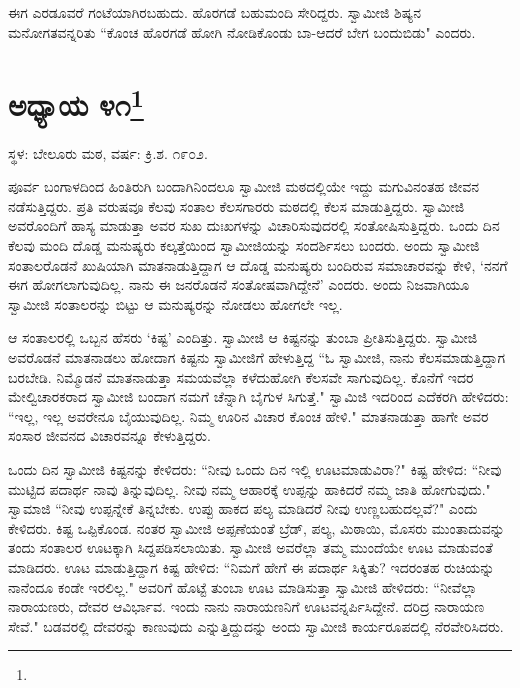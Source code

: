 ಈಗ ಎರಡೂವರೆ ಗಂಟೆಯಾಗಿರಬಹುದು. ಹೊರಗಡೆ ಬಹುಮಂದಿ ಸೇರಿದ್ದರು. ಸ್ವಾಮೀಜಿ ಶಿಷ್ಯನ ಮನೋಗತವನ್ನರಿತು “ಕೊಂಚ ಹೊರಗಡೆ ಹೋಗಿ ನೋಡಿಕೊಂಡು ಬಾ-ಆದರೆ ಬೇಗ ಬಂದುಬಿಡು" ಎಂದರು.

\newpage

\chapter[ಅಧ್ಯಾಯ ೪೧]{ಅಧ್ಯಾಯ ೪೧\protect\footnote{}}

\centerline{ಸ್ಥಳ: ಬೇಲೂರು ಮಠ, ವರ್ಷ: ಕ್ರಿ.ಶ. ೧೯೦೨.}

ಪೂರ್ವ ಬಂಗಾಳದಿಂದ ಹಿಂತಿರುಗಿ ಬಂದಾಗಿನಿಂದಲೂ ಸ್ವಾಮೀಜಿ ಮಠದಲ್ಲಿಯೇ ಇದ್ದು ಮಗುವಿನಂತಹ ಜೀವನ ನಡೆಸುತ್ತಿದ್ದರು. ಪ್ರತಿ ವರುಷವೂ ಕೆಲವು ಸಂತಾಲ ಕೆಲಸಗಾರರು ಮಠದಲ್ಲಿ ಕೆಲಸ ಮಾಡುತ್ತಿದ್ದರು. ಸ್ವಾಮೀಜಿ ಅವರೊಂದಿಗೆ ಹಾಸ್ಯ ಮಾಡುತ್ತಾ ಅವರ ಸುಖ ದುಃಖಗಳನ್ನು ವಿಚಾರಿಸುವುದರಲ್ಲಿ ಸಂತೋಷಿಸುತ್ತಿದ್ದರು. ಒಂದು ದಿನ ಕೆಲವು ಮಂದಿ ದೊಡ್ಡ ಮನುಷ್ಯರು ಕಲ್ಕತ್ತೆಯಿಂದ ಸ್ವಾಮೀಜಿಯನ್ನು ಸಂದರ್ಶಿಸಲು ಬಂದರು. ಅಂದು ಸ್ವಾಮೀಜಿ ಸಂತಾಲರೊಡನೆ ಖುಷಿಯಾಗಿ ಮಾತನಾಡುತ್ತಿದ್ದಾಗ ಆ ದೊಡ್ಡ ಮನುಷ್ಯರು ಬಂದಿರುವ ಸಮಾಚಾರವನ್ನು ಕೇಳಿ, ‘ನನಗೆ ಈಗ ಹೋಗಲಾಗುವುದಿಲ್ಲ. ನಾನು ಈ ಜನರೊಡನೆ ಸಂತೋಷವಾಗಿದ್ದೇನೆ’ ಎಂದರು. ಅಂದು ನಿಜವಾಗಿಯೂ ಸ್ವಾಮೀಜಿ ಸಂತಾಲರನ್ನು ಬಿಟ್ಟು ಆ ಮನುಷ್ಯರನ್ನು ನೋಡಲು ಹೋಗಲೇ ಇಲ್ಲ.

ಆ ಸಂತಾಲರಲ್ಲಿ ಒಬ್ಬನ ಹೆಸರು ‘ಕಿಷ್ಟ’ ಎಂದಿತ್ತು. ಸ್ವಾಮೀಜಿ ಆ ಕಿಷ್ಟನನ್ನು ತುಂಬಾ ಪ್ರೀತಿಸುತ್ತಿದ್ದರು. ಸ್ವಾಮೀಜಿ ಅವರೊಡನೆ ಮಾತನಾಡಲು ಹೋದಾಗ ಕಿಷ್ಟನು ಸ್ವಾಮೀಜಿಗೆ ಹೇಳುತ್ತಿದ್ದ “ಓ ಸ್ವಾಮೀಜಿ, ನಾನು ಕೆಲಸಮಾಡುತ್ತಿದ್ದಾಗ ಬರಬೇಡಿ. ನಿಮ್ಮೊಡನೆ ಮಾತನಾಡುತ್ತಾ ಸಮಯವೆಲ್ಲಾ ಕಳೆದುಹೋಗಿ ಕೆಲಸವೇ ಸಾಗುವುದಿಲ್ಲ. ಕೊನೆಗೆ ಇದರ ಮೇಲ್ವಿಚಾರಕರಾದ ಸ್ವಾಮೀಜಿ ಬಂದಾಗ ನಮಗೆ ಚೆನ್ನಾಗಿ ಬೈಗುಳ ಸಿಗುತ್ತೆ." ಸ್ವಾಮಿಜಿ ಇದರಿಂದ ಎದೆಕರಗಿ ಹೇಳಿದರು: “ಇಲ್ಲ, ಇಲ್ಲ ಅವರೇನೂ ಬೈಯುವುದಿಲ್ಲ. ನಿಮ್ಮ ಊರಿನ ವಿಚಾರ ಕೊಂಚ ಹೇಳಿ." ಮಾತನಾಡುತ್ತಾ ಹಾಗೇ ಅವರ ಸಂಸಾರ ಜೀವನದ ವಿಚಾರವನ್ನೂ ಕೇಳುತ್ತಿದ್ದರು.

ಒಂದು ದಿನ ಸ್ವಾಮೀಜಿ ಕಿಷ್ಟನನ್ನು ಕೇಳಿದರು: “ನೀವು ಒಂದು ದಿನ ಇಲ್ಲಿ ಊಟಮಾಡುವಿರಾ?" ಕಿಷ್ಟ ಹೇಳಿದ: “ನೀವು ಮುಟ್ಟಿದ ಪದಾರ್ಥ ನಾವು ತಿನ್ನುವುದಿಲ್ಲ. ನೀವು ನಮ್ಮ ಆಹಾರಕ್ಕೆ ಉಪ್ಪನ್ನು ಹಾಕಿದರೆ ನಮ್ಮ ಜಾತಿ ಹೋಗುವುದು." ಸ್ವಾಮಾಜಿ “ನೀವು ಉಪ್ಪನ್ನೇಕೆ ತಿನ್ನಬೇಕು. ಉಪ್ಪು ಹಾಕದ ಪಲ್ಯ ಮಾಡಿದರೆ ನೀವು ಉಣ್ಣಬಹುದಲ್ಲವೆ?" ಎಂದು ಕೇಳಿದರು. ಕಿಷ್ಟ ಒಪ್ಪಿಕೊಂಡ. ನಂತರ ಸ್ವಾಮೀಜಿ ಅಪ್ಪಣೆಯಂತೆ ಬ್ರೆಡ್, ಪಲ್ಯ, ಮಿಠಾಯಿ, ಮೊಸರು ಮುಂತಾದುವನ್ನು ತಂದು ಸಂತಾಲರ ಊಟಕ್ಕಾಗಿ ಸಿದ್ದಪಡಿಸಲಾಯಿತು. ಸ್ವಾಮೀಜಿ ಅವರೆಲ್ಲಾ ತಮ್ಮ ಮುಂದೆಯೇ ಊಟ ಮಾಡುವಂತೆ ಮಾಡಿದರು. ಊಟ ಮಾಡುತ್ತಿದ್ದಾಗ ಕಿಷ್ಟ ಹೇಳಿದ: “ನಿಮಗೆ ಹೇಗೆ ಈ ಪದಾರ್ಥ ಸಿಕ್ಕಿತು? ಇದರಂತಹ ರುಚಿಯನ್ನು ನಾನೆಂದೂ ಕಂಡೇ ಇರಲಿಲ್ಲ." ಅವರಿಗೆ ಹೊಟ್ಟೆ ತುಂಬಾ ಊಟ ಮಾಡಿಸುತ್ತಾ ಸ್ವಾಮೀಜಿ ಹೇಳಿದರು: “ನೀವೆಲ್ಲಾ ನಾರಾಯಣರು, ದೇವರ ಆವಿರ್ಭಾವ. ಇಂದು ನಾನು ನಾರಾಯಣನಿಗೆ ಊಟವನ್ನರ್ಪಿಸಿದ್ದೇನೆ. ದರಿದ್ರ ನಾರಾಯಣ ಸೇವೆ." ಬಡವರಲ್ಲಿ ದೇವರನ್ನು ಕಾಣುವುದು ಎನ್ನುತ್ತಿದ್ದುದನ್ನು ಅಂದು ಸ್ವಾಮೀಜಿ ಕಾರ್ಯರೂಪದಲ್ಲಿ ನೆರವೇರಿಸಿದರು.

